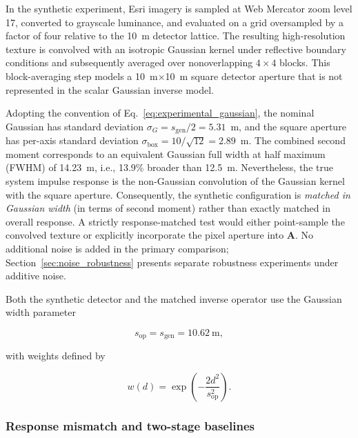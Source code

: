\documentclass[journal]{IEEEtran}
\begin{document}
In the synthetic experiment, Esri imagery is sampled at Web Mercator zoom level 17, converted to grayscale luminance, and evaluated on a grid oversampled by a factor of four relative to the 10~m detector lattice. The resulting high-resolution texture is convolved with an isotropic Gaussian kernel under reflective boundary conditions and subsequently averaged over nonoverlapping $4\times4$ blocks. This block-averaging step models a 10~m$\times$10~m square detector aperture that is not represented in the scalar Gaussian inverse model.

Adopting the convention of Eq.~\eqref{eq:experimental_gaussian}, the nominal Gaussian has standard deviation $\sigma_G=s_{\mathrm{gen}}/2=5.31$~m, and the square aperture has per-axis standard deviation $\sigma_{\mathrm{box}}=10/\sqrt{12}=2.89$~m. The combined second moment corresponds to an equivalent Gaussian full width at half maximum (FWHM) of 14.23~m, i.e., 13.9\% broader than 12.5~m. Nevertheless, the true system impulse response is the non-Gaussian convolution of the Gaussian kernel with the square aperture. Consequently, the synthetic configuration is \emph{matched in Gaussian width} (in terms of second moment) rather than exactly matched in overall response. A strictly response-matched test would either point-sample the convolved texture or explicitly incorporate the pixel aperture into $\mathbf A$. No additional noise is added in the primary comparison; Section~\ref{sec:noise_robustness} presents separate robustness experiments under additive noise.

Both the synthetic detector and the matched inverse operator use
the Gaussian width parameter

\begin{equation}
s_{\mathrm{op}}=s_{\mathrm{gen}}=10.62~\mathrm{m},
\end{equation}

with weights defined by

\begin{equation}
w(d)
=
\exp\left(
-\frac{2d^2}{s_{\mathrm{op}}^2}
\right).
\label{eq:experimental_gaussian}
\end{equation}


\subsubsection{Response mismatch and two-stage baselines}
\label{sec:psf_mismatch}
\end{document}
